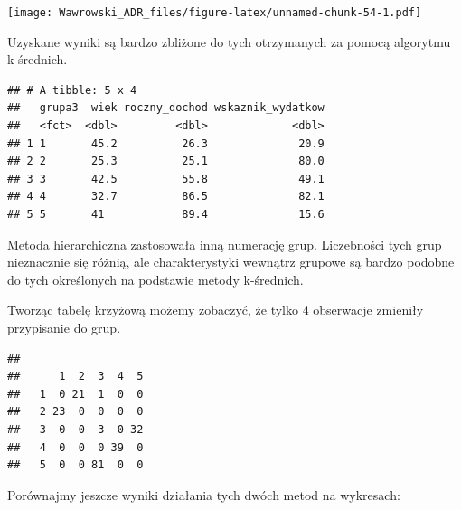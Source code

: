 \documentclass[
]{book}
\newenvironment{Shaded}{\begin{snugshade}}{\end{snugshade}}
\newcommand{\DataTypeTok}[1]{\textcolor[rgb]{0.13,0.29,0.53}{#1}}
\newcommand{\KeywordTok}[1]{\textcolor[rgb]{0.13,0.29,0.53}{\textbf{#1}}}
\newcommand{\NormalTok}[1]{#1}
\newcommand{\OperatorTok}[1]{\textcolor[rgb]{0.81,0.36,0.00}{\textbf{#1}}}
\newcommand{\StringTok}[1]{\textcolor[rgb]{0.31,0.60,0.02}{#1}}
\begin{document}
\texttt{[image: Wawrowski\_ADR\_files/figure-latex/unnamed-chunk-54-1.pdf]}

Uzyskane wyniki są bardzo zbliżone do tych otrzymanych za pomocą algorytmu k-średnich.

\begin{Shaded}
\end{Shaded}

\begin{verbatim}
## # A tibble: 5 x 4
##   grupa3  wiek roczny_dochod wskaznik_wydatkow
##   <fct>  <dbl>         <dbl>             <dbl>
## 1 1       45.2          26.3              20.9
## 2 2       25.3          25.1              80.0
## 3 3       42.5          55.8              49.1
## 4 4       32.7          86.5              82.1
## 5 5       41            89.4              15.6
\end{verbatim}

Metoda hierarchiczna zastosowała inną numerację grup. Liczebności tych grup nieznacznie się różnią, ale charakterystyki wewnątrz grupowe są bardzo podobne do tych określonych na podstawie metody k-średnich.

Tworząc tabelę krzyżową możemy zobaczyć, że tylko 4 obserwacje zmieniły przypisanie do grup.

\begin{Shaded}
\end{Shaded}

\begin{verbatim}
##    
##      1  2  3  4  5
##   1  0 21  1  0  0
##   2 23  0  0  0  0
##   3  0  0  3  0 32
##   4  0  0  0 39  0
##   5  0  0 81  0  0
\end{verbatim}

Porównajmy jeszcze wyniki działania tych dwóch metod na wykresach:
\end{document}
